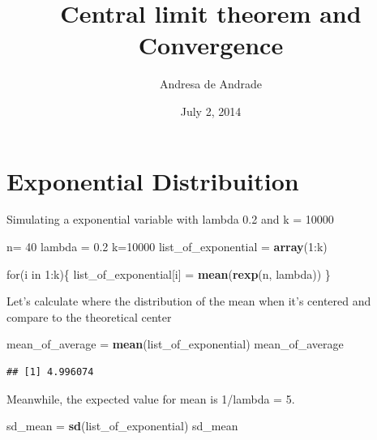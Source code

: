 \documentclass[]{article}
\title{Central limit theorem and Convergence}
\author{Andresa de Andrade}
\date{July 2, 2014}
\newenvironment{Shaded}{\begin{snugshade}}{\end{snugshade}}
\newcommand{\KeywordTok}[1]{\textcolor[rgb]{0.13,0.29,0.53}{\textbf{{#1}}}}
\newcommand{\DecValTok}[1]{\textcolor[rgb]{0.00,0.00,0.81}{{#1}}}
\newcommand{\FloatTok}[1]{\textcolor[rgb]{0.00,0.00,0.81}{{#1}}}
\newcommand{\StringTok}[1]{\textcolor[rgb]{0.31,0.60,0.02}{{#1}}}
\newcommand{\NormalTok}[1]{{#1}}
\begin{document}
\maketitle


{
\hypersetup{linkcolor=black}
\setcounter{tocdepth}{2}
\tableofcontents
}
\newpage 

\section{Exponential Distribuition}\label{exponential-distribuition}

Simulating a exponential variable with lambda 0.2 and k = 10000

\begin{Shaded}
\begin{Highlighting}[]
\NormalTok{n=}\StringTok{ }\DecValTok{40}
\NormalTok{lambda =}\StringTok{ }\FloatTok{0.2}
\NormalTok{k=}\DecValTok{10000}
\NormalTok{list_of_exponential =}\StringTok{ }\KeywordTok{array}\NormalTok{(}\DecValTok{1}\NormalTok{:k)}

\NormalTok{for(i in }\DecValTok{1}\NormalTok{:k)\{}
  \NormalTok{list_of_exponential[i] =}\StringTok{ }\KeywordTok{mean}\NormalTok{(}\KeywordTok{rexp}\NormalTok{(n, lambda))}
\NormalTok{\}}
\end{Highlighting}
\end{Shaded}

Let's calculate where the distribution of the mean when it's centered
and compare to the theoretical center

\begin{Shaded}
\begin{Highlighting}[]
\NormalTok{mean_of_average =}\StringTok{ }\KeywordTok{mean}\NormalTok{(list_of_exponential)}
\NormalTok{mean_of_average}
\end{Highlighting}
\end{Shaded}

\begin{verbatim}
## [1] 4.996074
\end{verbatim}

Meanwhile, the expected value for mean is 1/lambda = 5.

\begin{Shaded}
\begin{Highlighting}[]
\NormalTok{sd_mean =}\StringTok{ }\KeywordTok{sd}\NormalTok{(list_of_exponential)}
\NormalTok{sd_mean}
\end{Highlighting}
\end{Shaded}
\end{document}
